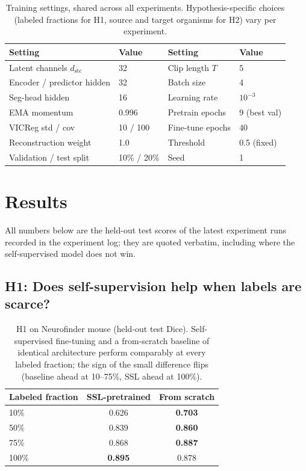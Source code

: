 \documentclass[twoside,11pt]{article}
\begin{document}
\begin{table}[t]
\centering
\begin{tabular}{llll}
\toprule
Setting & Value & Setting & Value \\
\midrule
Latent channels $d_{\mathrm{stc}}$ & 32 & Clip length $T$ & 5 \\
Encoder / predictor hidden & 32 & Batch size & 4 \\
Seg-head hidden & 16 & Learning rate & $10^{-3}$ \\
EMA momentum & 0.996 & Pretrain epochs & 9 (best val) \\
VICReg std / cov & 10 / 100 & Fine-tune epochs & 40 \\
Reconstruction weight & 1.0 & Threshold & 0.5 (fixed) \\
Validation / test split & 10\% / 20\% & Seed & 1 \\
\bottomrule
\end{tabular}
\caption{Training settings, shared across all experiments. Hypothesis-specific choices (labeled
fractions for H1, source and target organisms for H2) vary per experiment.}
\label{tab:hparams}
\end{table}

\section{Results}
\label{sec:results}

All numbers below are the held-out test scores of the latest experiment runs recorded in the
experiment log; they are quoted verbatim, including where the self-supervised model does not win.

\subsection{H1: Does self-supervision help when labels are scarce?}

\begin{table}[t]
\centering
\begin{tabular}{lcc}
\toprule
Labeled fraction & SSL-pretrained & From scratch \\
\midrule
10\%  & 0.626 & \textbf{0.703} \\
50\%  & 0.839 & \textbf{0.860} \\
75\%  & 0.868 & \textbf{0.887} \\
100\% & \textbf{0.895} & 0.878 \\
\bottomrule
\end{tabular}
\caption{H1 on Neurofinder mouse (held-out test Dice). Self-supervised fine-tuning and a
from-scratch baseline of identical architecture perform comparably at every labeled fraction; the
sign of the small difference flips (baseline ahead at 10--75\%, SSL ahead at 100\%).}
\label{tab:h1}
\end{table}
\end{document}
